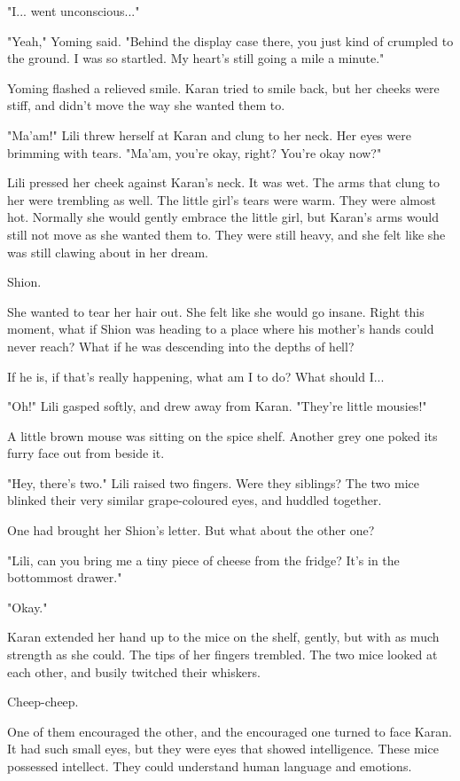 "I... went unconscious..."

"Yeah," Yoming said. "Behind the display case there, you just kind of
crumpled to the ground. I was so startled. My heart's still going a mile
a minute."

Yoming flashed a relieved smile. Karan tried to smile back, but her
cheeks were stiff, and didn't move the way she wanted them to.

"Ma'am!" Lili threw herself at Karan and clung to her neck. Her eyes
were brimming with tears. "Ma'am, you're okay, right? You're okay now?"

Lili pressed her cheek against Karan's neck. It was wet. The arms that
clung to her were trembling as well. The little girl's tears were warm.
They were almost hot. Normally she would gently embrace the little girl,
but Karan's arms would still not move as she wanted them to. They were
still heavy, and she felt like she was still clawing about in her dream.

Shion.

She wanted to tear her hair out. She felt like she would go insane.
Right this moment, what if Shion was heading to a place where his
mother's hands could never reach? What if he was descending into the
depths of hell?

If he is, if that's really happening, what am I to do? What should I...

"Oh!" Lili gasped softly, and drew away from Karan. "They're little
mousies!"

A little brown mouse was sitting on the spice shelf. Another grey one
poked its furry face out from beside it.

"Hey, there's two." Lili raised two fingers. Were they siblings? The two
mice blinked their very similar grape-coloured eyes, and huddled
together.

One had brought her Shion's letter. But what about the other one?

"Lili, can you bring me a tiny piece of cheese from the fridge? It's in
the bottommost drawer."

"Okay."

Karan extended her hand up to the mice on the shelf, gently, but with as
much strength as she could. The tips of her fingers trembled. The two
mice looked at each other, and busily twitched their whiskers.

Cheep-cheep.

One of them encouraged the other, and the encouraged one turned to face
Karan. It had such small eyes, but they were eyes that showed
intelligence. These mice possessed intellect. They could understand
human language and emotions.

